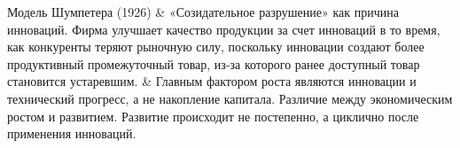 \documentclass[12pt,a4paper, oneside]{extreport}
\begin{document}
\begin{longtable}
	
	Модель Шумпетера (1926)   &
	«Созидательное  разрушение» как  причина  инноваций. 
	Фирма  улучшает качество продукции за счет инноваций в то время, как  конкуренты теряют рыночную силу, 
	поскольку инновации создают  более продуктивный промежуточный товар, из-за которого   ранее доступный товар  становится  устаревшим.		
	&  
	Главным фактором  роста являются   инновации и технический прогресс, а не накопление капитала.   	
	Различие между экономическим ростом и развитием.  
	Развитие происходит не постепенно, а циклично после применения инноваций.  
	\\\hline
\end{longtable}











%
\end{document}
